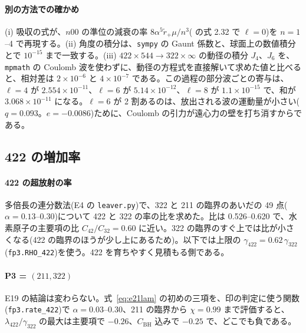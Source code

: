 \paragraph{別の方法での確かめ}
(i) 吸収の式が、$n00$ の準位の減衰の率 $8\alpha^5\tilde r_+\mu/n^3$( の式 2.32 で $\ell=0$)を $n=1$--4 で再現する。(ii) 角度の積分は、\texttt{sympy} の Gaunt 係数と、球面上の数値積分とで $10^{-15}$ まで一致する。(iii) $422\times544\to322\times\infty$ の動径の積分 $J_4$、$J_6$ を、\texttt{mpmath} の Coulomb 波を使わずに、動径の方程式を直接解いて求めた値と比べると、相対差は $2\times10^{-6}$ と $4\times10^{-7}$ である。この過程の部分波ごとの寄与は、$\ell=4$ が $2.554\times10^{-11}$、$\ell=6$ が $5.14\times10^{-12}$、$\ell=8$ が $1.1\times10^{-15}$ で、和が $3.068\times10^{-11}$ になる。$\ell=6$ が 2 割あるのは、放出される波の運動量が小さい($q=0.093$。$e=-0.0086$)ために、Coulomb の引力が遠心力の壁を打ち消すからである。

\subsection{422 の増加率}

\paragraph{422 の超放射の率}
多倍長の連分数法(E4 の \texttt{leaver.py})で、322 と 211 の臨界のあいだの 49 点($\alpha=0.13$--0.30)について 422 と 322 の率の比を求めた。比は 0.526--0.620 で、水素原子の主要項の比 $C_{42}/C_{32}=0.60$ に近い。322 の臨界のすぐ上では比が小さくなる(422 の臨界のほうが少し上にあるため)。以下では上限の $\gamma_{422}=0.62\,\gamma_{322}$(\texttt{fp3.RHO\_422})を使う。422 を育ちやすく見積もる側である。

\paragraph{P3 = $(211,322)$}
E19 の結論は変わらない。式~\eqref{eq:e21lam} の初めの三項を、印の判定に使う関数(\texttt{fp3.rate\_422})で $\alpha=0.03$--0.30、211 の臨界から $\chi=0.99$ まで評価すると、$\lambda_{422}/\gamma_{322}$ の最大は主要項で $-0.26$、$C_\mathrm{BH}$ 込みで $-0.25$ で、どこでも負である。

